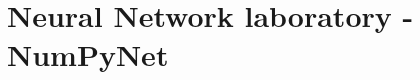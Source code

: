\documentclass{standalone}
\begin{document}
\section[NumPyNet]{Neural Network laboratory - NumPyNet}\label{numpynet}

\end{document}
